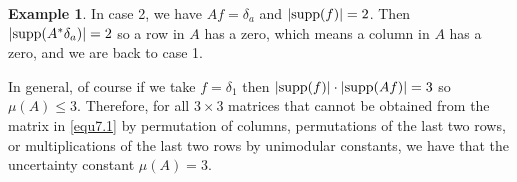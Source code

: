 \documentclass[11pt]{amsart}
\theoremstyle{definition}
\newtheorem{example}[theorem]{Example}
\theoremstyle{remark}
\numberwithin{equation}{section}
\newcommand{\suport}{\textup{supp}}
\begin{document}
\begin{example}
In case 2, we have $Af=\delta_a$ and $|\suport(f)|=2$. Then $|\suport(A^*\delta_a)|=2$ so a row in $A$ has a zero, which means a column in $A$ has a zero, and we are back to case 1.

In general, of course if we take $f=\delta_1$ then $|\suport(f)|\cdot|\suport(Af)|=3$ so $\mu(A)\leq 3$. Therefore, for all $3\times 3$ matrices that cannot be obtained from the matrix in \eqref{equ7.1} by permutation of columns, permutations of the last two rows, or multiplications of the last two rows by unimodular constants, we have that the uncertainty constant $\mu(A)=3$.






\end{example}
\end{document}
